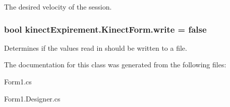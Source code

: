 The desired velocity of the session. 

\subsubsection[{\texorpdfstring{write}{write}}]{\setlength{\rightskip}{0pt plus 5cm}bool kinect\+Expirement.\+Kinect\+Form.\+write = false}\hypertarget{classkinect_expirement_1_1_kinect_form_a2faba08ba3886e70886d6289dcc09896}{}\label{classkinect_expirement_1_1_kinect_form_a2faba08ba3886e70886d6289dcc09896}


Determines if the values read in should be written to a file. 



The documentation for this class was generated from the following files\+:\begin{DoxyCompactItemize}
\item 
Form1.\+cs\item 
Form1.\+Designer.\+cs\end{DoxyCompactItemize}
